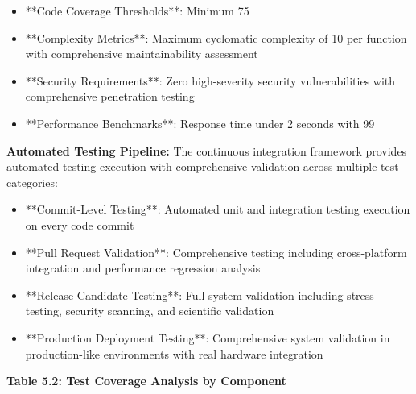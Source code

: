 \documentclass[11pt,a4paper]{report}
\begin{document}
\begin{itemize}
\item **Code Coverage Thresholds**: Minimum 75%
\item **Complexity Metrics**: Maximum cyclomatic complexity of 10 per function with comprehensive maintainability assessment
\item **Security Requirements**: Zero high-severity security vulnerabilities with comprehensive penetration testing
\item **Performance Benchmarks**: Response time under 2 seconds with 99%

\end{itemize}
\textbf{Automated Testing Pipeline:}
The continuous integration framework provides automated testing execution with comprehensive validation across multiple
test categories:

\begin{itemize}
\item **Commit-Level Testing**: Automated unit and integration testing execution on every code commit
\item **Pull Request Validation**: Comprehensive testing including cross-platform integration and performance regression
  analysis
\item **Release Candidate Testing**: Full system validation including stress testing, security scanning, and scientific
  validation
\item **Production Deployment Testing**: Comprehensive system validation in production-like environments with real hardware
  integration

\end{itemize}
\textbf{Table 5.2: Test Coverage Analysis by Component}
\end{document}
